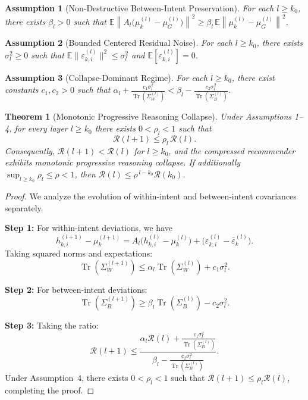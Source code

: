\documentclass[lettersize,journal]{IEEEtran}
\newtheorem{theorem}{Theorem}
\newtheorem{assumption}{Assumption}
\newcommand{\E}{\mathbb{E}}
\newcommand{\tr}{\operatorname{Tr}}
\begin{document}
\begin{assumption}[Non-Destructive Between-Intent Preservation]
For each $l \ge k_0$, there exists $\beta_l > 0$ such that
$\E \left\|A_l\bigl(\mu_k^{(l)} - \mu_G^{(l)}\bigr)\right\|^2
\ge
\beta_l \,
\E \left\|\mu_k^{(l)} - \mu_G^{(l)}\right\|^2$.
\end{assumption}

\begin{assumption}[Bounded Centered Residual Noise]
For each $l \ge k_0$, there exists $\sigma_l^2 \ge 0$ such that
$\E \|\varepsilon_{k,i}^{(l)}\|^2 \le \sigma_l^2$ and $\E[\varepsilon_{k,i}^{(l)}]=0$.
\end{assumption}

\begin{assumption}[Collapse-Dominant Regime]
For each $l \ge k_0$, there exist constants $c_1,c_2>0$ such that
$\alpha_l + \frac{c_1 \sigma_l^2}{\tr(\Sigma_W^{(l)})}
<
\beta_l - \frac{c_2 \sigma_l^2}{\tr(\Sigma_B^{(l)})}$.
\end{assumption}

\begin{theorem}[Monotonic Progressive Reasoning Collapse]
Under Assumptions 1--4, for every layer $l \ge k_0$ there exists $0<\rho_l<1$ such that
\begin{equation}
\mathcal{R}(l+1) \le \rho_l \,\mathcal{R}(l).
\end{equation}
Consequently, $\mathcal{R}(l+1) < \mathcal{R}(l)$ for $l \ge k_0$, and the compressed recommender exhibits monotonic progressive reasoning collapse. If additionally $\sup_{l\ge k_0}\rho_l \le \rho <1$, then $\mathcal{R}(l) \le \rho^{\,l-k_0}\mathcal{R}(k_0)$.
\end{theorem}

\begin{proof}
We analyze the evolution of within-intent and between-intent covariances separately.

\textbf{Step 1:} For within-intent deviations, we have
\begin{equation}
h_{k,i}^{(l+1)} - \mu_k^{(l+1)}
=
A_l\bigl(h_{k,i}^{(l)} - \mu_k^{(l)}\bigr)
+
\bigl(\varepsilon_{k,i}^{(l)} - \bar{\varepsilon}_k^{(l)}\bigr).
\end{equation}
Taking squared norms and expectations:
\begin{equation}
\tr(\Sigma_W^{(l+1)})
\le
\alpha_l \tr(\Sigma_W^{(l)}) + c_1 \sigma_l^2.
\end{equation}

\textbf{Step 2:} For between-intent deviations:
\begin{equation}
\tr(\Sigma_B^{(l+1)})
\ge
\beta_l \tr(\Sigma_B^{(l)}) - c_2 \sigma_l^2.
\end{equation}

\textbf{Step 3:} Taking the ratio:
\begin{equation}
\mathcal{R}(l+1)
\le
\frac{
\alpha_l \mathcal{R}(l) + \frac{c_1 \sigma_l^2}{\tr(\Sigma_B^{(l)})}
}{
\beta_l - \frac{c_2 \sigma_l^2}{\tr(\Sigma_B^{(l)})}
}.
\end{equation}
Under Assumption~4, there exists $0<\rho_l<1$ such that $\mathcal{R}(l+1) \le \rho_l \mathcal{R}(l)$, completing the proof.
\end{proof}
\end{document}
